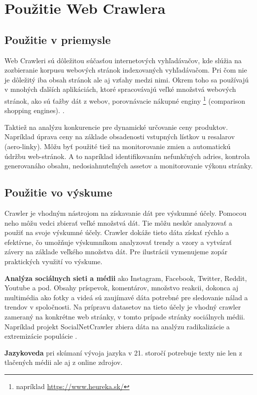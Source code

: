 \section{Použitie Web Crawlera}
\subsection{Použitie v priemysle}
Web Crawleri sú dôležitou súčasťou internetových vyhľadávačov, kde slúžia na zozbieranie korpusu webových stránok indexovaných vyhľadávačom. Pri čom nie je dôležitý iba obsah stránok ale aj vzťahy medzi nimi. Okrem toho sa používajú v mnohých ďalších aplikáciách, ktoré spracovávajú veľké množstvá webových stránok, ako sú ťažby dát z webov, porovnávacie nákupné enginy \footnote{ napríklad \url{https://www.heureka.sk/}} (comparison shopping engines). \cite{encykOfDatabases}.  

Taktiež na analýzu konkurencie pre dynamické určovanie ceny produktov. Napríklad úprava ceny na základe obsadenosti vstupných lístkov u resalarov (aero-linky). 
Môžu byť použité tiež na monitorovanie zmien a automatickú údržbu web-stránok. A to napríklad identifikovaním nefunkčných adries, kontrola generovanáho obsahu, nedosiahnuteľných assetov a monitorovanie výkonu stránky. \cite{crawlPageTesting}

\subsection{Použitie vo výskume}
Crawler je vhodným nástrojom na získavanie dát pre výskumné účely. Pomocou neho môžu vedci zbierať veľké množstvá dát. Tie môžu neskôr analyzovať a použiť na svoje výskumné účely. Crawler dokáže tieto dáta získať rýchlo a efektívne, čo umožňuje výskumníkom analyzovať trendy a vzory a vytvárať závery na základe veľkého množstva dát. Pre ilustrácii vymenujeme zopár praktických využití vo výskume. 

\textbf{Analýza sociálnych sieti a médii} ako Instagram, Facebook, Twitter, Reddit, Youtube a pod. Obsahy príspevok, komentárov, množstvo reakcii, dokonca aj multimédia ako fotky a videá sú zaujímavé dáta potrebné pre sledovanie nálad a trendov v spoločnosti. Na prípravu datasetov na tieto účely je vhodný crawler zameraný na konkrétne web stránky, v tomto prípade stránky sociálnych médii. Napríklad projekt SocialNetCrawler zbiera dáta na analýzu radikalizácie a extremizácie populácie \cite{socialNetCrawler}.

\textbf{Jazykoveda} pri skúmaní vývoja jazyka v 21. storočí potrebuje texty nie len z tlačených médii ale aj z online zdrojov. 

